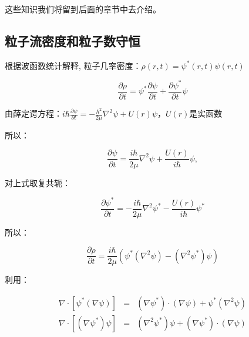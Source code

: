 这些知识我们将留到后面的章节中去介绍。

\subsection{粒子流密度和粒子数守恒}

根据波函数统计解释, 粒子几率密度：$\rho (r,t) = \psi ^* (r,t)\psi
(r,t)$



\begin{equation}
\frac{{\partial \rho}}{{\partial t}} = \psi ^* \frac{{\partial \psi
}}{{\partial t}} + \frac{{\partial \psi ^* }}{{\partial t}}\psi
\end{equation}

由薛定谔方程：$i\hbar \frac{{\partial \psi }}{{\partial t}} =  - \frac{{\hbar ^2 }}{{2\mu }}\nabla ^2 \psi  + U(r)\psi $，$U(r)$是实函数

所以：

\begin{equation}
\frac{{\partial \psi }}{{\partial t}} = \frac{{i\hbar }}{{2\mu }}\nabla ^2 \psi  + \frac{{U(r)}}{{i\hbar }}\psi ,
\end{equation}

对上式取复共轭：

\begin{equation}
\frac{{\partial \psi ^* }}{{\partial t}} =  - \frac{{i\hbar }}{{2\mu }}\nabla ^2 \psi ^*  - \frac{{U(r)}}{{i\hbar }}\psi ^*
\end{equation}

所以：

\begin{equation}
\frac{{\partial \rho}}{{\partial t}} = \frac{{i\hbar }}{{2\mu
}}\left( {\psi ^* \left( {\nabla ^2 \psi } \right) - \left( {\nabla
^2 \psi ^* } \right)\psi } \right)
\end{equation}

利用：

\begin{eqnarray}
\nabla  \cdot \left[ {\psi ^* \left( {\nabla \psi } \right)} \right] & = & \left( {\nabla \psi ^* } \right) \cdot \left( {\nabla \psi } \right) + \psi ^* \left( {\nabla ^2 \psi } \right) \\
 \nabla  \cdot \left[ {\left( {\nabla \psi ^* } \right)\psi } \right] & = & \left( {\nabla ^2 \psi ^* } \right)\psi  + \left( {\nabla \psi ^* } \right) \cdot \left( {\nabla \psi } \right)
\end{eqnarray}



